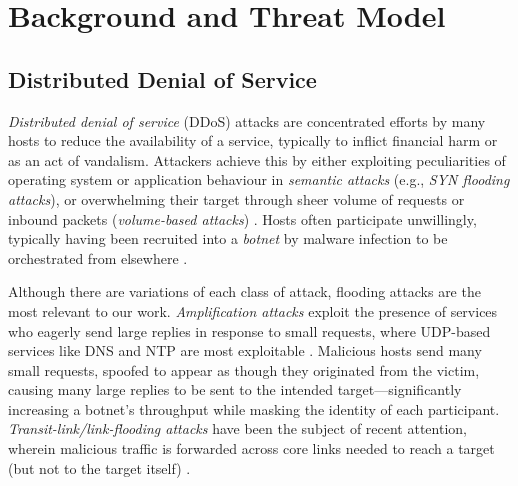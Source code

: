\documentclass[10pt, times, comsoc]{IEEEtran}
\begin{document}
\section{Background and Threat Model}

\subsection{Distributed Denial of Service}


\emph{Distributed denial of service} (DDoS) attacks are concentrated efforts by many hosts to reduce the availability of a service, typically to inflict financial harm or as an act of vandalism.
Attackers achieve this by either exploiting peculiarities of operating system or application behaviour in \emph{semantic attacks} (e.g., \emph{SYN flooding attacks}), or overwhelming their target through sheer volume of requests or inbound packets (\emph{volume-based attacks}) \cite{DBLP:conf/imc/JonkerKKRSD17}.
Hosts often participate unwillingly, typically having been recruited into a \emph{botnet} by malware infection to be orchestrated from elsewhere \cite{DBLP:conf/uss/AntonakakisABBB17}.

Although there are variations of each class of attack, flooding attacks are the most relevant to our work.
\emph{Amplification attacks} exploit the presence of services who eagerly send large replies in response to small requests, where UDP-based services like DNS and NTP are most exploitable \cite{DBLP:conf/ndss/Rossow14, DBLP:conf/uss/KuhrerHRH14}.
Malicious hosts send many small requests, spoofed to appear as though they originated from the victim, causing many large replies to be sent to the intended target---significantly increasing a botnet's throughput while masking the identity of each participant.
\emph{Transit-link/link-flooding attacks} have been the subject of recent attention, wherein malicious traffic is forwarded across core links needed to reach a target (but not to the target itself) \cite{DBLP:conf/sp/KangLG13, DBLP:conf/esorics/StuderP09}.
\end{document}

